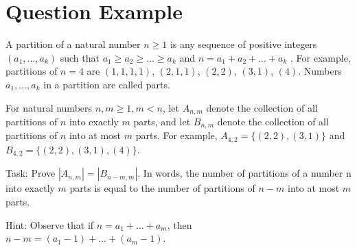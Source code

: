 \section*{Question Example}

A partition of a natural number $ n \ge 1 $ is any sequence of positive integers $ (a_1 , . . . , a_k ) $ such
that $ a_1 \ge a_2 \ge . . . \ge a_k $ and $ n = a_1 + a_2 + . . . + a_k $ . For example, partitions of $ n = 4 $ are
$ (1, 1, 1, 1) $, $ (2, 1, 1) $, $ (2, 2) $, $ (3, 1) $, $ (4) $. Numbers $ a_1 , . . . , a_k $ in a partition are called parts.



For natural numbers $ n, m \ge 1, m < n $, let $ A_{n,m} $ denote the collection of all partitions of $ n $ into
exactly $ m $ parts, and let $ B_{n,m} $ denote the collection of all partitions of $ n $ into at most $ m $ parts.
For example, $A_{4,2} = \{(2, 2), (3, 1)\} $ and $B_{4,2} = \{(2, 2), (3, 1), (4)\} $.


Task: Prove $ |A_{n,m}| = |B_{n-m,m}| $. In words, the number of partitions of a number n into
exactly $ m $ parts is equal to the number of partitions of $ n - m $ into at most $ m $ parts.


Hint: Observe that if $ n = a_1 + \dots + a_m $, then $ n - m = (a_1 -1) + \dots + (a_m - 1) $.


